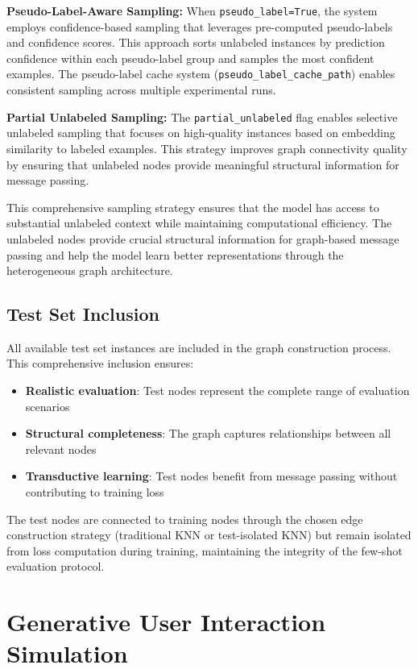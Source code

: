 \textbf{Pseudo-Label-Aware Sampling:} When \texttt{pseudo\_label=True}, the system employs confidence-based sampling that leverages pre-computed pseudo-labels and confidence scores. This approach sorts unlabeled instances by prediction confidence within each pseudo-label group and samples the most confident examples. The pseudo-label cache system (\texttt{pseudo\_label\_cache\_path}) enables consistent sampling across multiple experimental runs.

\textbf{Partial Unlabeled Sampling:} The \texttt{partial\_unlabeled} flag enables selective unlabeled sampling that focuses on high-quality instances based on embedding similarity to labeled examples. This strategy improves graph connectivity quality by ensuring that unlabeled nodes provide meaningful structural information for message passing.

This comprehensive sampling strategy ensures that the model has access to substantial unlabeled context while maintaining computational efficiency. The unlabeled nodes provide crucial structural information for graph-based message passing and help the model learn better representations through the heterogeneous graph architecture.

\subsection{Test Set Inclusion}

All available test set instances are included in the graph construction process. This comprehensive inclusion ensures:
\begin{itemize}
    \item \textbf{Realistic evaluation}: Test nodes represent the complete range of evaluation scenarios
    \item \textbf{Structural completeness}: The graph captures relationships between all relevant nodes
    \item \textbf{Transductive learning}: Test nodes benefit from message passing without contributing to training loss
\end{itemize}

The test nodes are connected to training nodes through the chosen edge construction strategy (traditional KNN or test-isolated KNN) but remain isolated from loss computation during training, maintaining the integrity of the few-shot evaluation protocol.

\section{Generative User Interaction Simulation}

